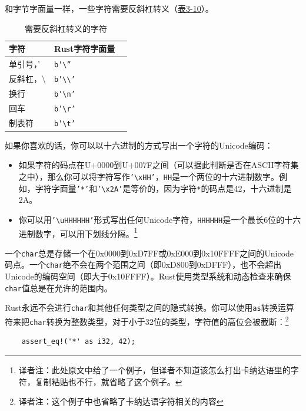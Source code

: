 和字节字面量一样，一些字符需要反斜杠转义（\hyperref[t3-10]{表3-10}）。
\begin{table}[htbp]
    \centering
    \caption{需要反斜杠转义的字符}
    \label{t3-10}
    \begin{tabular}{lll}
        \hline
        \textbf{字符}   &   \textbf{Rust字符字面量} \\
        \hline
        单引号，'   &   \texttt{b'\textbackslash''} \\
        \rowcolor{tablecolor}
        反斜杠，\textbackslash &    \texttt{b'\textbackslash\textbackslash'} \\
        换行        &    \texttt{b'\textbackslash n'} \\
        \rowcolor{tablecolor}
        回车        &   \texttt{b'\textbackslash r'} \\
        制表符      &   \texttt{b'\textbackslash t'} \\
    \end{tabular}
\end{table}

如果你喜欢的话，你可以以十六进制的方式写出一个字符的Unicode编码：
\begin{itemize}
    \item 如果字符的码点在U+0000到U+007F之间（可以据此判断是否在ASCII字符集之中），那么你可以将字符写作\texttt{'\textbackslash xHH'}，\texttt{HH}是一个两位的十六进制数字。例如，字符字面量\texttt{'*'}和\texttt{'\textbackslash x2A'}是等价的，因为字符\texttt{*}的码点是42，十六进制是2A。
    \item 你可以用\texttt{'\textbackslash u{HHHHHH}'}形式写出任何Unicode字符，\texttt{HHHHHH}是一个最长6位的十六进制数字，可以用下划线分隔。\footnote{译者注：此处原文中给了一个例子，但译者不知道该怎么打出卡纳达语里的字符，复制粘贴也不行，就省略了这个例子。}
\end{itemize}

一个\texttt{char}总是存储一个在0x0000到0xD7FF或0xE000到0x10FFFF之间的Unicode码点。一个\texttt{char}绝不会在两个范围之间（即0xD800到0xDFFF），也不会超出Unicode的编码空间（即大于0x10FFFF）。Rust使用类型系统和动态检查来确保\texttt{char}值总是在允许的范围内。

Rust永远不会进行\texttt{char}和其他任何类型之间的隐式转换。你可以使用\texttt{as}转换运算符来把\texttt{char}转换为整数类型，对于小于32位的类型，字符值的高位会被截断：\footnote{译者注：这个例子中也省略了卡纳达语字符相关的内容}
\begin{verbatim}
    assert_eq!('*' as i32, 42);
\end{verbatim}

